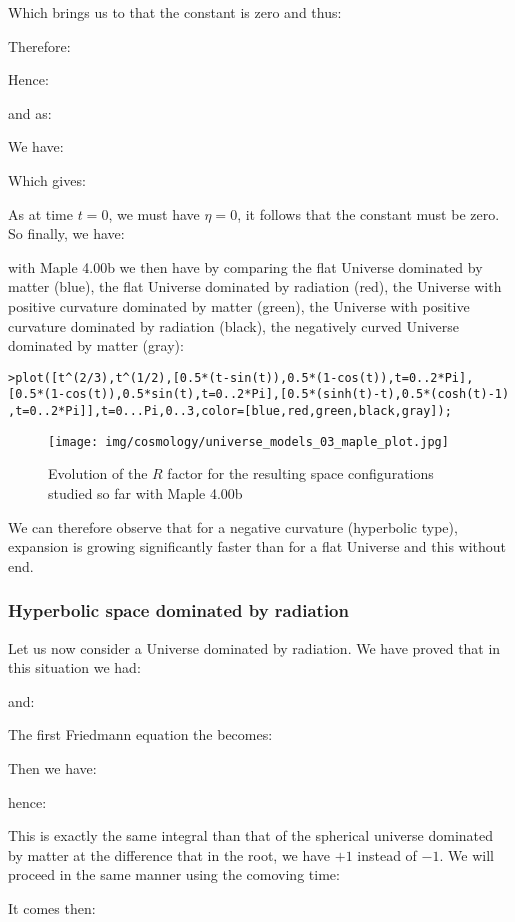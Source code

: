 	Which brings us to that the constant is zero and thus:
	
	Therefore:
	
	Hence:
	
	and as:
	
	We have:
	
	Which gives:
	
	As at time $t=0$, we must have $\eta=0$, it follows that the constant must be zero. So finally, we have:
	
	with Maple 4.00b we then have by comparing the flat Universe dominated by matter (blue), the flat Universe dominated by radiation (red), the Universe with positive curvature dominated by matter (green), the Universe with positive curvature dominated by radiation (black), the negatively curved Universe dominated by matter (gray):
	
	\texttt{>plot([t\string^(2/3),t\string^(1/2),[0.5*(t-sin(t)),0.5*(1-cos(t)),t=0..2*Pi],}\\
	\texttt{[0.5*(1-cos(t)),0.5*sin(t),t=0..2*Pi],[0.5*(sinh(t)-t),0.5*(cosh(t)-1)}
	\texttt{,t=0..2*Pi]],t=0...Pi,0..3,color=[blue,red,green,black,gray]);}
	\begin{figure}[H]
		\centering
		\texttt{[image: img/cosmology/universe\_models\_03\_maple\_plot.jpg]}
		\caption[]{Evolution of the $R$ factor for the resulting space configurations studied so far with Maple 4.00b}
	\end{figure}
	We can therefore observe that for a negative curvature (hyperbolic type), expansion is growing significantly faster than for a flat Universe and this without end.
	
	\subsubsection{Hyperbolic space dominated by radiation}
	Let us now consider a Universe dominated by radiation. We have proved that in this situation we had:
	
	and:
	
	The first Friedmann equation the becomes:
	
	Then we have:
	
	hence:
	
	This is exactly the same integral than that of the spherical universe dominated by matter at the difference that in the root, we have $+1$ instead of $-1$. We will proceed in the same manner using the comoving time:
	
	It comes then:
	
